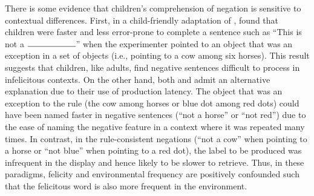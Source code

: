 \documentclass[man, noapacite]{apa2}
\begin{document}
There is some evidence that children's comprehension of negation is sensitive to contextual differences. First, in a child-friendly adaptation of ,  found that children were faster and less error-prone to complete a sentence such as ``This is not a $\rule{2cm}{0.15mm}$'' when the experimenter pointed to an object that was an exception in a set of objects (i.e., pointing to a cow among six horses). This result suggests that children, like adults, find negative sentences difficult to process in infelicitous contexts. On the other hand, both  and  admit an alternative explanation due to their use of production latency. The object that was an exception to the rule (the cow among horses or blue dot among red dots) could have been named faster in negative sentences (``not a horse'' or ``not red'') due to the ease of naming the negative feature in a context where it was repeated many times. In contrast, in the rule-consistent negations (``not a cow'' when pointing to a horse or ``not blue'' when pointing to a red dot), the label to be produced was infrequent in the display and hence likely to be slower to retrieve. Thus, in these paradigms, felicity and environmental frequency are positively confounded such that the felicitous word is also more frequent in the environment.
\end{document}
